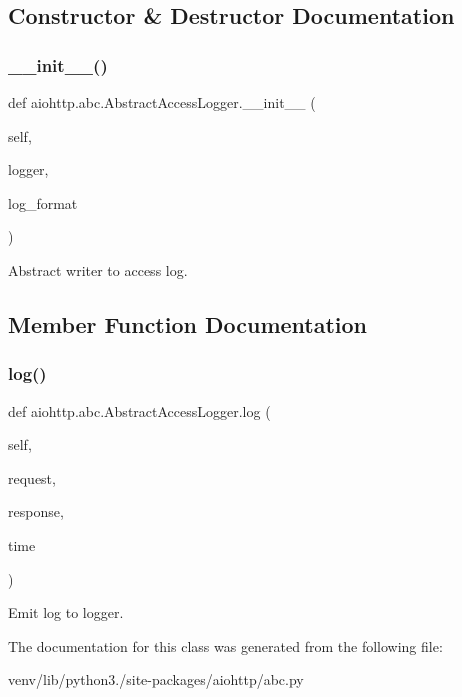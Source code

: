 \subsection{Constructor \& Destructor Documentation}
\mbox{\label{classaiohttp_1_1abc_1_1_abstract_access_logger_aaefc25fb2d9d10109c03153f0937e860}} 
\subsubsection{\texorpdfstring{\+\_\+\+\_\+init\+\_\+\+\_\+()}{\_\_init\_\_()}}
{\footnotesize\ttfamily def aiohttp.\+abc.\+Abstract\+Access\+Logger.\+\_\+\+\_\+init\+\_\+\+\_\+ (\begin{DoxyParamCaption}\item[{}]{self,  }\item[{}]{logger,  }\item[{}]{log\+\_\+format }\end{DoxyParamCaption})}

\begin{DoxyVerb}Abstract writer to access log.\end{DoxyVerb}
 

\subsection{Member Function Documentation}
\mbox{\label{classaiohttp_1_1abc_1_1_abstract_access_logger_a0499617c36d7e00bceae17826279949f}} 
\subsubsection{\texorpdfstring{log()}{log()}}
{\footnotesize\ttfamily def aiohttp.\+abc.\+Abstract\+Access\+Logger.\+log (\begin{DoxyParamCaption}\item[{}]{self,  }\item[{}]{request,  }\item[{}]{response,  }\item[{}]{time }\end{DoxyParamCaption})}

\begin{DoxyVerb}Emit log to logger.\end{DoxyVerb}
 

The documentation for this class was generated from the following file\+:\begin{DoxyCompactItemize}
\item 
venv/lib/python3./site-\/packages/aiohttp/abc.\+py\end{DoxyCompactItemize}
